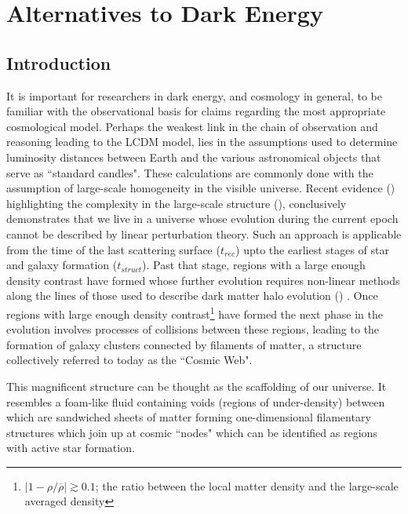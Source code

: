 \chapter{Alternatives to Dark Energy}


\section{Introduction}

It is important for researchers in dark energy, and cosmology in general, to be familiar with the observational basis for claims regarding the most appropriate cosmological model. Perhaps the weakest link in the chain of observation and reasoning leading to the LCDM model, lies in the assumptions used to determine luminosity distances between Earth and the various astronomical objects that serve as ``standard candles". These calculations are commonly done with the assumption of large-scale homogeneity in the visible universe. Recent evidence (\cite{York2000The-Sloan,Abazajian2009The-Seventh,Percival2001The-2dF-Galaxy}) highlighting the complexity in the large-scale structure (\cite{vandeWeygaert2009Geometry,vandeWeygaert2004Hierarchy,Shandarin2004Morphology}), conclusively demonstrates that we live in a universe whose evolution during the current epoch cannot be described by linear perturbation theory. Such an approach is applicable from the time of the last scattering surface ($ t_{rec}$) upto the earliest stages of star and galaxy formation ($ t_{struct} $). Past that stage, regions with a large enough density contrast have formed whose further evolution requires non-linear methods along the lines of those used to describe dark matter halo evolution (\cite{Giocoli2007An-improved}) . Once regions with large enough density contrast\footnote{$ |1-\rho/\overline{\rho}| \gtrsim 0.1 $; the ratio between the local matter density and the large-scale averaged density} have formed the next phase in the evolution involves processes of collisions between these regions, leading to the formation of galaxy clusters connected by filaments of matter, a structure collectively referred to today as the ``Cosmic Web".

This magnificent structure can be thought as the scaffolding of our universe. It resembles a foam-like fluid containing voids (regions of under-density) between which are sandwiched sheets of matter forming one-dimensional filamentary structures which join up at cosmic ``nodes" which can be identified as regions with active star formation.

